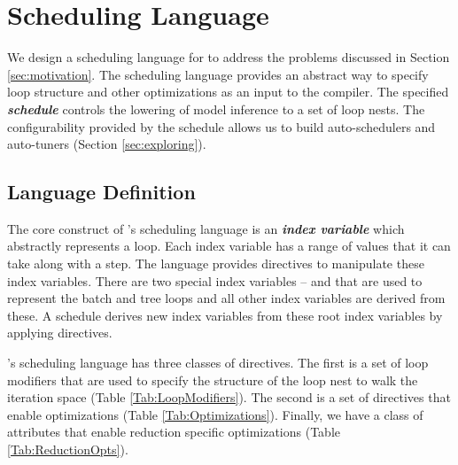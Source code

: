 \section{Scheduling Language}
\label{sec:schedule}
We design a scheduling language for \Treebeard{}
to address the problems discussed in Section \ref{sec:motivation}. The scheduling 
language provides an abstract way to specify loop structure and 
other optimizations as an input to the compiler. The specified 
\textbf{\emph{schedule}} controls the lowering of model inference to a set of 
loop nests. The configurability provided by the schedule allows us 
to build auto-schedulers and auto-tuners (Section \ref{sec:exploring}).


\subsection{Language Definition}
The core construct of \Treebeard{}'s scheduling language is an 
\textbf{\emph{index variable}} which abstractly represents a loop. 
Each index variable has a range of values that it can take along 
with a step. 
The language provides directives to manipulate these index 
variables. There are two special index variables --  and
 that are used to represent the batch and tree loops and all 
other index variables are derived from these. A schedule derives 
new index variables from these root index variables by applying
directives. 

\Treebeard{}'s scheduling language has three classes of directives. The first is a set 
of loop modifiers that are used to specify the structure of the loop nest to
walk the iteration space (Table \ref{Tab:LoopModifiers}). The second is a set of 
directives that enable optimizations (Table \ref{Tab:Optimizations}). 
Finally, we have a class of attributes that enable reduction specific optimizations
(Table \ref{Tab:ReductionOpts}).

